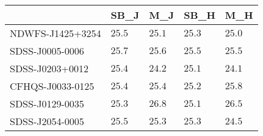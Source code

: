 \begin{tabular}{lllll}
\toprule
{} &    SB_J &     M_J &    SB_H &     M_H \\
\midrule
NDWFS-J1425+3254 &  $25.5$ &  $25.1$ &  $25.3$ &  $25.0$ \\
SDSS-J0005-0006  &  $25.7$ &  $25.6$ &  $25.5$ &  $25.5$ \\
SDSS-J0203+0012  &  $25.4$ &  $24.2$ &  $25.1$ &  $24.1$ \\
CFHQS-J0033-0125 &  $25.4$ &  $25.4$ &  $25.2$ &  $25.8$ \\
SDSS-J0129-0035  &  $25.3$ &  $26.8$ &  $25.1$ &  $26.5$ \\
SDSS-J2054-0005  &  $25.5$ &  $25.3$ &  $25.3$ &  $24.5$ \\
\bottomrule
\end{tabular}
